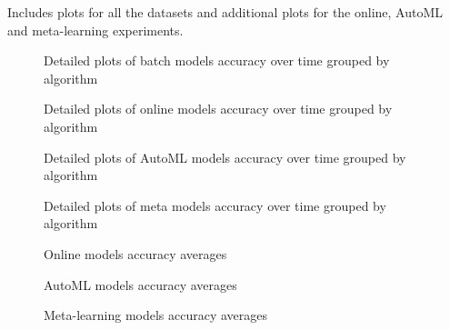 \documentclass{sig-alternate-br}
\begin{document}
Includes plots for all the datasets and additional plots for the online, AutoML and meta-learning experiments.

\begin{figure}[h!]
\centering 
{}
\caption{Detailed plots of batch models accuracy over time grouped by algorithm}
\label{fig:batchall}
\end{figure}

\begin{figure}[h!]
\centering 
{}
\caption{Detailed plots of online models accuracy over time grouped by algorithm}
\label{fig:online_all}
\end{figure}

\begin{figure}[h!]
\centering 
{}
\caption{Detailed plots of AutoML models accuracy over time grouped by algorithm}
\label{fig:automlall}
\end{figure}

\begin{figure}[h!]
\centering 
{}
\caption{Detailed plots of meta models accuracy over time grouped by algorithm}
\label{fig:metaall}
\end{figure}


\begin{figure}[h!]
\centering 
{}
\caption{Online models accuracy averages}
\label{fig:online_violin}
\end{figure}

\begin{figure}[h!]
\centering 
{}
\caption{AutoML models accuracy averages}
\label{fig:automl_violin}
\end{figure}

\begin{figure}[h!]
\centering 
{}
\caption{Meta-learning models accuracy averages}
\label{fig:meta_violin}
\end{figure}
\end{document}
